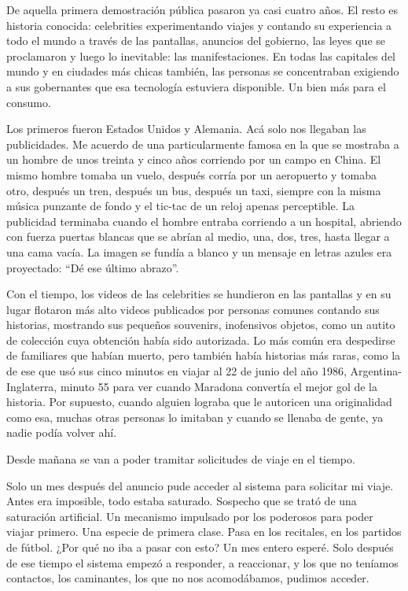 \documentclass[12pt,twoside,openright]{book}
\begin{document}
De aquella primera demostración pública pasaron ya casi cuatro años. El resto es historia conocida: celebrities experimentando viajes y contando su experiencia a todo el mundo a través de las pantallas, anuncios del gobierno, las leyes que se proclamaron y luego lo inevitable: las manifestaciones. En todas las capitales del mundo y en ciudades más chicas también, las personas se concentraban exigiendo a sus gobernantes que esa tecnología estuviera disponible. Un bien más para el consumo.

Los primeros fueron Estados Unidos y Alemania. Acá solo nos llegaban las publicidades. Me acuerdo de una particularmente famosa en la que se mostraba a un hombre de unos treinta y cinco años corriendo por un campo en China. El mismo hombre tomaba un vuelo, después corría por un aeropuerto y tomaba otro, después un tren, después un bus, después un taxi, siempre con la misma música punzante de fondo y el tic-tac de un reloj apenas perceptible. La publicidad terminaba cuando el hombre entraba corriendo a un hospital, abriendo con fuerza puertas blancas que se abrían al medio, una, dos, tres, hasta llegar a una cama vacía. La imagen se fundía a blanco y un mensaje en letras azules era proyectado: “Dé ese último abrazo”.

Con el tiempo, los videos de las celebrities se hundieron en las pantallas y en su lugar flotaron más alto videos publicados por personas comunes contando sus historias, mostrando sus pequeños souvenirs, inofensivos objetos, como un autito de colección cuya obtención había sido autorizada. Lo más común era despedirse de familiares que habían muerto, pero también había historias más raras, como la de ese que usó sus cinco minutos en viajar al 22 de junio del año 1986, Argentina-Inglaterra, minuto 55 para ver cuando Maradona convertía el mejor gol de la historia. Por supuesto, cuando alguien lograba que le autoricen una originalidad como esa, muchas otras personas lo imitaban y cuando se llenaba de gente, ya nadie podía volver ahí.

Desde mañana se van a poder tramitar solicitudes de viaje en el tiempo.



Solo un mes después del anuncio pude acceder al sistema para solicitar mi viaje. Antes era imposible, todo estaba saturado. Sospecho que se trató de una saturación artificial. Un mecanismo impulsado por los poderosos para poder viajar primero. Una especie de primera clase. Pasa en los recitales, en los partidos de fútbol. ¿Por qué no iba a pasar con esto? Un mes entero esperé. Solo después de ese tiempo el sistema empezó a responder, a reaccionar, y los que no teníamos contactos, los caminantes, los que no nos acomodábamos, pudimos acceder.
\end{document}
